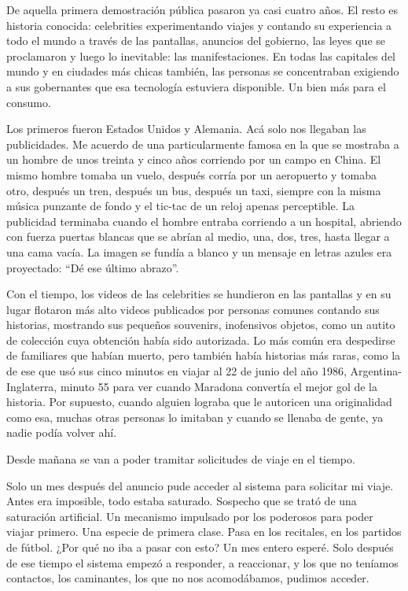 \documentclass[12pt,twoside,openright]{book}
\begin{document}
De aquella primera demostración pública pasaron ya casi cuatro años. El resto es historia conocida: celebrities experimentando viajes y contando su experiencia a todo el mundo a través de las pantallas, anuncios del gobierno, las leyes que se proclamaron y luego lo inevitable: las manifestaciones. En todas las capitales del mundo y en ciudades más chicas también, las personas se concentraban exigiendo a sus gobernantes que esa tecnología estuviera disponible. Un bien más para el consumo.

Los primeros fueron Estados Unidos y Alemania. Acá solo nos llegaban las publicidades. Me acuerdo de una particularmente famosa en la que se mostraba a un hombre de unos treinta y cinco años corriendo por un campo en China. El mismo hombre tomaba un vuelo, después corría por un aeropuerto y tomaba otro, después un tren, después un bus, después un taxi, siempre con la misma música punzante de fondo y el tic-tac de un reloj apenas perceptible. La publicidad terminaba cuando el hombre entraba corriendo a un hospital, abriendo con fuerza puertas blancas que se abrían al medio, una, dos, tres, hasta llegar a una cama vacía. La imagen se fundía a blanco y un mensaje en letras azules era proyectado: “Dé ese último abrazo”.

Con el tiempo, los videos de las celebrities se hundieron en las pantallas y en su lugar flotaron más alto videos publicados por personas comunes contando sus historias, mostrando sus pequeños souvenirs, inofensivos objetos, como un autito de colección cuya obtención había sido autorizada. Lo más común era despedirse de familiares que habían muerto, pero también había historias más raras, como la de ese que usó sus cinco minutos en viajar al 22 de junio del año 1986, Argentina-Inglaterra, minuto 55 para ver cuando Maradona convertía el mejor gol de la historia. Por supuesto, cuando alguien lograba que le autoricen una originalidad como esa, muchas otras personas lo imitaban y cuando se llenaba de gente, ya nadie podía volver ahí.

Desde mañana se van a poder tramitar solicitudes de viaje en el tiempo.



Solo un mes después del anuncio pude acceder al sistema para solicitar mi viaje. Antes era imposible, todo estaba saturado. Sospecho que se trató de una saturación artificial. Un mecanismo impulsado por los poderosos para poder viajar primero. Una especie de primera clase. Pasa en los recitales, en los partidos de fútbol. ¿Por qué no iba a pasar con esto? Un mes entero esperé. Solo después de ese tiempo el sistema empezó a responder, a reaccionar, y los que no teníamos contactos, los caminantes, los que no nos acomodábamos, pudimos acceder.
\end{document}
